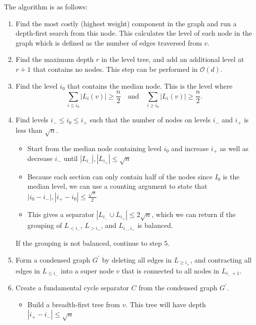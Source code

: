 \documentclass[11pt]{article}
\begin{document}
The algorithm is as follows:
\begin{enumerate}

    \item Find the most costly (highest weight) component in the graph and run a depth-first search from this node. This calculates the level of each node in the graph which is defined as the number of edges traversed from $v$. 

    \item Find the maximum depth $r$ in the level tree, and add an additional level at $r+1$ that contains no nodes. This step can be performed in $\mathcal{O}(d)$.

    \item Find the level $i_0$ that contains the median node. This is the level where
    \[
    \sum_{i \leq i_0} |L_i(v)| \geq \frac{n}{2} \quad \text{and}\quad \sum_{i \geq i_0} |L_i(v)| \geq \frac{n}{2}.
    \]

    \item Find levels $i_- \leq i_0 \leq i_+$ such that the number of nodes on levels $i_-$ and $i_+$ is less than $\sqrt{n}$.
    \begin{itemize}
        \item Start from the median node containing level $i_0$ and increase $i_+$ as well as decrease $i_-$ until $|L_{i_-}|,|L_{i_+}| \leq \sqrt{n}$

        \item Because each section can only contain half of the nodes since $I_0$ is the median level, we can use a counting argument to state that $|i_0 - i_-|,|i_+ - i_0| \leq \frac{\sqrt{n}}{2}$

        \item This gives a separator $|L_{i_-} \cup L_{i_+}| \leq 2 \sqrt{n}$, which we can return if the grouping of $L_{< i_-}$, $L_{> i_+}$, and $L_{i_-,i_+}$ is balanced.
    \end{itemize}
    If the grouping is not balanced, continue to step $5$.

    \item Form a condensed graph $G^{'}$ by deleting  all edges in $L_{\geq i_+}$, and contracting all edges in $L_{\leq i_-}$ into a super node $v$ that is connected to all nodes in $L_{i_- + 1}$.

    \item Create a fundamental cycle separator $C$ from the condensed graph $G^{'}$.
    \begin{itemize}
        \item Build a breadth-first tree from $v$. This tree will have depth $|i_+ - i_-| \leq \sqrt{n}$


\end{itemize}
\end{enumerate}
\end{document}
